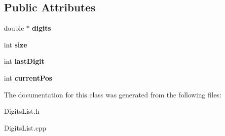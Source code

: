 \subsection*{Public Attributes}
\begin{DoxyCompactItemize}
\item 
\hypertarget{class_digits_list_ade233072d05a290c8dae6f76f9551831}{}double $\ast$ {\bfseries digits}\label{class_digits_list_ade233072d05a290c8dae6f76f9551831}

\item 
\hypertarget{class_digits_list_ae1e9517bd687d1b2727e84a80416b192}{}int {\bfseries size}\label{class_digits_list_ae1e9517bd687d1b2727e84a80416b192}

\item 
\hypertarget{class_digits_list_ab4978c206993f2a2f382d3f2646daded}{}int {\bfseries last\+Digit}\label{class_digits_list_ab4978c206993f2a2f382d3f2646daded}

\item 
\hypertarget{class_digits_list_a90a7daaca5877e9c9037af8449e71b68}{}int {\bfseries current\+Pos}\label{class_digits_list_a90a7daaca5877e9c9037af8449e71b68}

\end{DoxyCompactItemize}


The documentation for this class was generated from the following files\+:\begin{DoxyCompactItemize}
\item 
Digits\+List.\+h\item 
Digits\+List.\+cpp\end{DoxyCompactItemize}
